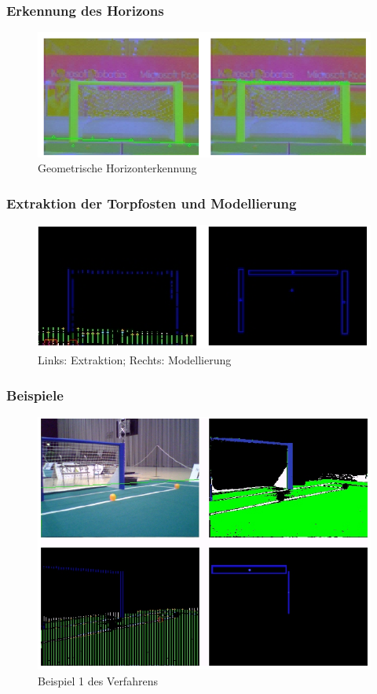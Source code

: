 \documentclass[a4paper,12pt]{article}
\begin{document}
\subsubsection{Erkennung des Horizons}
\begin{figure}[H]
\includegraphics[scale=0.8]{geometric-plane.png}
\caption{Geometrische Horizonterkennung}
\label{fig:geom-horiz}
\end{figure}

\subsubsection{Extraktion der Torpfosten und Modellierung}
\begin{figure}[H]
\includegraphics[scale=0.8]{goal-blobs.png}
\caption{Links: Extraktion; Rechts: Modellierung}
\label{fig:model}
\end{figure}

\subsubsection{Beispiele}
\begin{figure}[H]
\includegraphics[scale=0.8]{example-detection1.png}
\caption{Beispiel 1 des Verfahrens}
\label{fig:example1}
\end{figure}
\end{document}

